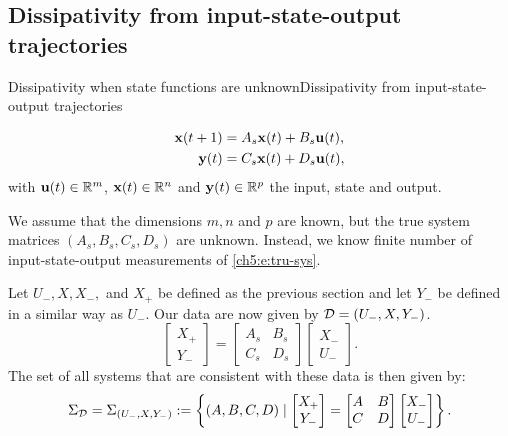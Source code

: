 \documentclass[aspectratio=169, handout, 10pt, hyperref=colorlinks]{beamer}
\begin{document}
\subsection{Dissipativity from input-state-output trajectories}
\begin{frame}[allowframebreaks]{Dissipativity when state functions are unknown}{Dissipativity from input-state-output trajectories}
    \begin{problem}
        \begin{equation}
            \label{ch5:e:tru-sys}
            \begin{aligned}
            \mathbf{x}(t+1)&=A_{s} \mathbf{x}(t)+B_{s} \mathbf{u}(t),\\
            \mathbf{y}(t)&=C_{s} \mathbf{x}(t)+D_{s} \mathbf{u}(t),  \end{aligned}
        \end{equation}
    with $\mathbf{u}(t) \in \mathbb{R}^m$, $\mathbf{x}(t) \in \mathbb{R}^n$ and $\mathbf{y}(t) \in\mathbb{R}^{p}$ the input, state and output.

    We assume that the dimensions $m,n$ and $p$ are known, but the true system matrices $(A_{s}, B_{s},C_{s},D_{s})$ are unknown. Instead, we know finite number of input-state-output measurements of \eqref{ch5:e:tru-sys}.
    \end{problem}  
    Let $U_-,X,X_-,$ and $X_+$ be defined as the previous section and let $Y_-$ be defined in a similar way as $U_-$. Our data are now given by $\mathcal{D} = (U_-,X,Y_-)$.
    \begin{equation}  \label{ch5:e:true system compatible}
    \begin{bmatrix}
    X_+ \\ Y_-
    \end{bmatrix} = \begin{bmatrix}
    A_s & B_s \\ C_s & D_s
    \end{bmatrix} \begin{bmatrix}
    X_- \\ U_-
    \end{bmatrix}.
    \end{equation}
    The set of all systems that are consistent with these data is then given by: 
    \begin{equation}
    \label{ch5:eq:sigma iso}
    \Sigma_{\mathcal{D}} = \Sigma_{(U_-,X,Y_-)}: = \left\{ (A,B,C,D) \mid \begin{bmatrix} X_+ \\ Y_- \end{bmatrix} = \begin{bmatrix} A & B \\ C & D \end{bmatrix} \begin{bmatrix} X_- \\ U_- \end{bmatrix} \right\}.
    \end{equation}
\end{frame}
\end{document}
